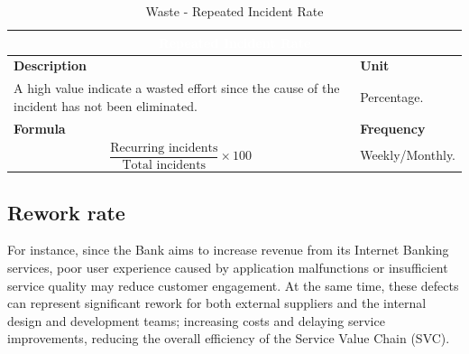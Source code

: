     \begin{table}[h]
        \centering
        \renewcommand{\arraystretch}{1.6}
        \setlength{\arrayrulewidth}{0.6pt}

        \begin{tabularx}{\textwidth}{|X|X|}
        \hline
        \multicolumn{2}{|c|}{\cellcolor{mcblue}\textcolor{white}{\textbf{Repeated Incident Rate}}} \\ \hline

        \rowcolor{mclightgray}
        \textbf{Description} & \textbf{Unit} \\ \hline
        A high value indicate a wasted effort since the cause of the incident has not been eliminated. &
        Percentage. \\ \hline

        \rowcolor{mclightgray}
        \textbf{Formula} & \textbf{Frequency} \\ \hline
        \[
            \frac{\text{Recurring incidents}}{\text{Total incidents}} \times 100
        \]

        &
        Weekly/Monthly. \\ \hline

        \end{tabularx}

        \caption{Waste - Repeated Incident Rate}
        \label{tab:measurement_RepeatedIncident}
    \end{table}


\subsection{Rework rate}

    For instance, since the Bank aims to increase revenue from its Internet Banking services, poor user experience caused by application malfunctions or insufficient service quality may reduce customer engagement. At the same time, these defects can represent significant rework for both external suppliers and the internal design and development teams; increasing costs and delaying service improvements, reducing the overall efficiency of the Service Value Chain (SVC).


